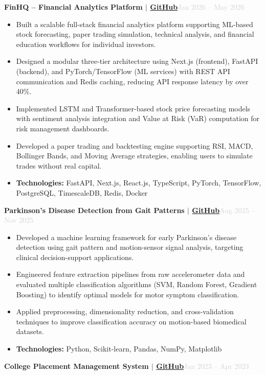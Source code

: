 \documentclass[a4paper,10.5pt]{article}
\newcommand{\resumeProject}[2]{%
  \vspace{3pt}%
  \noindent\textbf{\normalsize #1}\hfill\textcolor{lightgray}{\small #2}%
  \vspace{1pt}%
}
\newcommand{\resumeItem}[1]{%
  \item\small{#1}%
}
\newcommand{\resumeItemListStart}{%
  \begin{itemize}[leftmargin=0.18in, itemsep=1pt, topsep=2pt, parsep=0pt]%
}
\newcommand{\resumeItemListEnd}{%
  \end{itemize}\vspace{1pt}%
}
\begin{document}
\resumeProject
  {FinHQ -- Financial Analytics Platform $|$ \href{https://github.com/Abhijith-E/FinHQ}{GitHub}}{Jan 2026 -- May 2026}

\resumeItemListStart
  \resumeItem{
    Built a scalable full-stack financial analytics platform supporting ML-based stock forecasting, paper trading simulation, technical analysis, and financial education workflows for individual investors.
  }
  \resumeItem{
    Designed a modular three-tier architecture using Next.js (frontend), FastAPI (backend), and PyTorch/TensorFlow (ML services) with REST API communication and Redis caching, reducing API response latency by over 40\%.
  }
  \resumeItem{
    Implemented LSTM and Transformer-based stock price forecasting models with sentiment analysis integration and Value at Risk (VaR) computation for risk management dashboards.
  }
  \resumeItem{
    Developed a paper trading and backtesting engine supporting RSI, MACD, Bollinger Bands, and Moving Average strategies, enabling users to simulate trades without real capital.
  }
  \resumeItem{
    \textbf{Technologies:} FastAPI, Next.js, React.js, TypeScript, PyTorch, TensorFlow, PostgreSQL, TimescaleDB, Redis, Docker
  }
\resumeItemListEnd

\vspace{4pt}

\resumeProject
  {Parkinson's Disease Detection from Gait Patterns $|$ \href{https://github.com/Abhijith-E/Parkinsons_Disease_Detection}{GitHub}}{Aug 2025 -- Nov 2025}

\resumeItemListStart
  \resumeItem{
    Developed a machine learning framework for early Parkinson's disease detection using gait pattern and motion-sensor signal analysis, targeting clinical decision-support applications.
  }
  \resumeItem{
    Engineered feature extraction pipelines from raw accelerometer data and evaluated multiple classification algorithms (SVM, Random Forest, Gradient Boosting) to identify optimal models for motor symptom classification.
  }
  \resumeItem{
    Applied preprocessing, dimensionality reduction, and cross-validation techniques to improve classification accuracy on motion-based biomedical datasets.
  }
  \resumeItem{
    \textbf{Technologies:} Python, Scikit-learn, Pandas, NumPy, Matplotlib
  }
\resumeItemListEnd

\vspace{4pt}

\resumeProject
  {College Placement Management System $|$ \href{https://github.com/Abhijith-E/college-placement-management-system}{GitHub}}{Jan 2023 -- Apr 2023}
\end{document}
